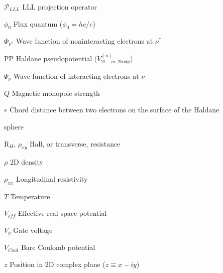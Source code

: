 \begin{abbrv}
\item[$\mathcal{P}_{LLL}$] \hspace*{4.5mm} LLL projection operator
\item[$\phi_0$] \hspace*{4.5mm} Flux quantum ($\phi_0=hc/e$)
\item[$\Phi_{\nu^*}$] \hspace*{4.5mm} Wave function of noninteracting electrons at $\nu^*$
\item[PP] \hspace*{4.5mm} Haldane pseudopotential ($V^{(n)}_{2l-m,2body}$)
\item[$\Psi_\nu$] \hspace*{4.5mm} Wave function of interacting electrons at $\nu$
\item[$Q$] \hspace*{4.5mm} Magnetic monopole strength 
\vspace{-18pt}
\begin{singlespace} 
    \item[$r$] \hspace*{4.5mm} Chord distance between two electrons on the surface of the Haldane 
    \item[] \hspace*{4.5mm} sphere
\end{singlespace} 
\item[R$_H$, $\rho_{xy}$] \hspace*{4.5mm} Hall, or transverse, resistance
\item[$\rho$] \hspace*{4.5mm} 2D density
\item[$\rho_{xx}$] \hspace*{4.5mm} Longitudinal resistivity
\item[$T$] \hspace*{4.5mm} Temperature
\item[$V_{eff}$] \hspace*{4.5mm} Effective real space potential
\item[$V_g$] \hspace*{4.5mm} Gate voltage
\item[$V_{Coul}$] \hspace*{4.5mm} Bare Coulomb potential
\item[$z$] \hspace*{4.5mm} Position in 2D complex plane ($z\equiv x-iy$)
\end{abbrv}

\singlespacing